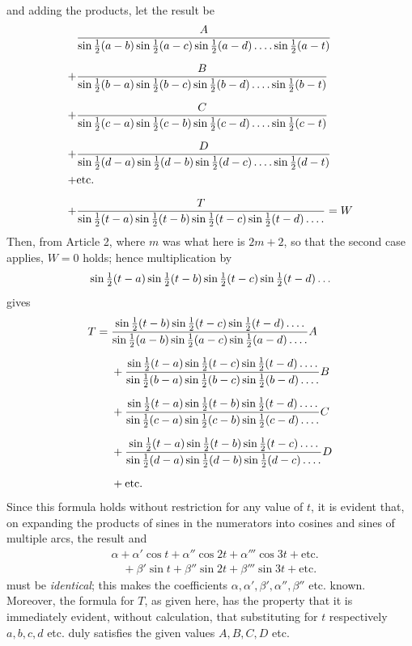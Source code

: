 and adding the products, let the result be
\[
\begin{aligned}
&\frac{A}{\sin\tfrac12(a-b)\sin\tfrac12(a-c)\sin\tfrac12(a-d)\mathinner{.\,.\,.\,.}\sin\tfrac12(a-t)}\\[6pt]
+{}&\frac{B}{\sin\tfrac12(b-a)\sin\tfrac12(b-c)\sin\tfrac12(b-d)\mathinner{.\,.\,.\,.}\sin\tfrac12(b-t)}\\[6pt]
+{}&\frac{C}{\sin\tfrac12(c-a)\sin\tfrac12(c-b)\sin\tfrac12(c-d)\mathinner{.\,.\,.\,.}\sin\tfrac12(c-t)}\\[6pt]
+{}&\frac{D}{\sin\tfrac12(d-a)\sin\tfrac12(d-b)\sin\tfrac12(d-c)\mathinner{.\,.\,.\,.}\sin\tfrac12(d-t)}\\
+{}&\text{etc.}\\[6pt]
+{}&\frac{T}{\sin\tfrac12(t-a)\sin\tfrac12(t-b)\sin\tfrac12(t-c)\sin\tfrac12(t-d)\mathinner{.\,.\,.\,.}}=W
\end{aligned}
\]
Then, from Article 2, where $m$ was what here is $2m+2$, so that the second case applies, $W=0$ holds; hence multiplication by
\[
\sin\tfrac12(t-a)\sin\tfrac12(t-b)\sin\tfrac12(t-c)\sin\tfrac12(t-d)\mathinner{.\,.\,.}
\]
gives
\[
\begin{aligned}
T={}&\frac{\sin\tfrac12(t-b)\sin\tfrac12(t-c)\sin\tfrac12(t-d)\mathinner{.\,.\,.\,.}}
{\sin\tfrac12(a-b)\sin\tfrac12(a-c)\sin\tfrac12(a-d)\mathinner{.\,.\,.\,.}}A\\[5pt]
&+\frac{\sin\tfrac12(t-a)\sin\tfrac12(t-c)\sin\tfrac12(t-d)\mathinner{.\,.\,.\,.}}
{\sin\tfrac12(b-a)\sin\tfrac12(b-c)\sin\tfrac12(b-d)\mathinner{.\,.\,.\,.}}B\\[5pt]
&+\frac{\sin\tfrac12(t-a)\sin\tfrac12(t-b)\sin\tfrac12(t-d)\mathinner{.\,.\,.\,.}}
{\sin\tfrac12(c-a)\sin\tfrac12(c-b)\sin\tfrac12(c-d)\mathinner{.\,.\,.\,.}}C\\[5pt]
&+\frac{\sin\tfrac12(t-a)\sin\tfrac12(t-b)\sin\tfrac12(t-c)\mathinner{.\,.\,.\,.}}
{\sin\tfrac12(d-a)\sin\tfrac12(d-b)\sin\tfrac12(d-c)\mathinner{.\,.\,.\,.}}D\\[5pt]
&+\text{etc.}
\end{aligned}
\]
Since this formula holds without restriction for any value of $t$, it is evident that, on expanding the products of sines in the numerators into cosines and sines of multiple
arcs, the result and
\[
\begin{aligned}
&\alpha+\alpha'\cos t+\alpha''\cos2t+\alpha'''\cos3t+\text{etc.}\\
&\quad+\beta'\sin t+\beta''\sin2t+\beta'''\sin3t+\text{etc.}
\end{aligned}
\]
must be \emph{identical}; this makes the coefficients $\alpha,\alpha',\beta',\alpha'',\beta''$ etc. known. Moreover, the formula for $T$, as given here, has the property that it is immediately evident, without calculation, that substituting for $t$ respectively $a,b,c,d$ etc. duly satisfies the given values $A,B,C,D$
etc.

